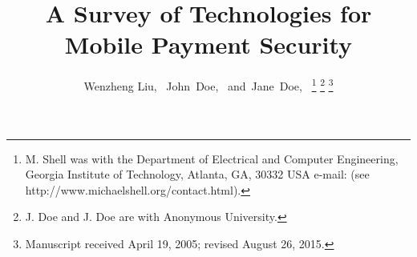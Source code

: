 \documentclass[journal]{IEEEtran}
\begin{document}
%
\title{A Survey of Technologies for Mobile Payment Security 
}
%
%
%

\author{Wenzheng Liu,~
        John~Doe,~
        and~Jane~Doe,~%
\thanks{M. Shell was with the Department
of Electrical and Computer Engineering, Georgia Institute of Technology, Atlanta,
GA, 30332 USA e-mail: (see http://www.michaelshell.org/contact.html).}%
\thanks{J. Doe and J. Doe are with Anonymous University.}%
\thanks{Manuscript received April 19, 2005; revised August 26, 2015.}}

% 
%
\end{document}
